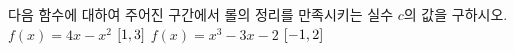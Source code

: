 다음 함수에 대하여 주어진 구간에서 롤의 정리를 만족시키는 실수 $c$의 값을 구하시오.
 $f(x)=4x-x^2$ \quad $[1{,}\mkern3mu\mathopen{}3]$
 $f(x)=x^3-3x-2$ \quad $[-1{,}\mkern3mu\mathopen{}2]$
